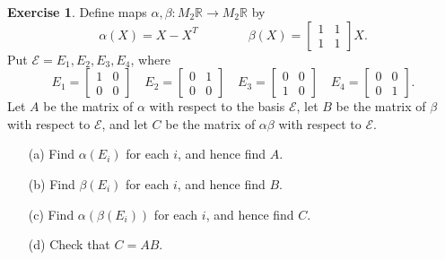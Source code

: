 \documentclass{amsart}
\newcommand{\R}         {{\mathbb{R}}}
\newcommand{\bsm}       {\left[\begin{smallmatrix}}
\newcommand{\esm}       {\end{smallmatrix}\right]}
\newcommand{\al}        {\alpha}
\newcommand{\bt}        {\beta}
\newcommand{\CE}        {{\mathcal{E}}}
\renewcommand{\:}       {\colon}
\theoremstyle{definition}
\newtheorem{exercise}{Exercise}[section]
\begin{document}
\begin{exercise}
 Define maps $\al,\bt\:M_2\R\to M_2\R$ by 
 \[ \al(X) = X-X^T \hspace{4em}
    \bt(X) = \bsm 1&1\\ 1&1\esm X.
 \]
 Put $\CE=E_1,E_2,E_3,E_4$, where
 \[ E_1 = \bsm 1&0\\0&0\esm \hspace{1em}
    E_2 = \bsm 0&1\\0&0\esm \hspace{1em}
    E_3 = \bsm 0&0\\1&0\esm \hspace{1em}
    E_4 = \bsm 0&0\\0&1\esm. 
 \]
 Let $A$ be the matrix of $\al$ with respect to the basis
 $\CE$, let $B$ be the matrix of $\bt$ with respect to
 $\CE$, and let $C$ be the matrix of $\al\bt$ with respect
 to $\CE$.
 \begin{itemize}
  \item[(a)] Find $\al(E_i)$ for each $i$, and hence find $A$.
  \item[(b)] Find $\bt(E_i)$ for each $i$, and hence find $B$.
  \item[(c)] Find $\al(\bt(E_i))$ for each $i$, and hence
   find $C$.
  \item[(d)] Check that $C=AB$.
 \end{itemize}
\end{exercise}
\end{document}
